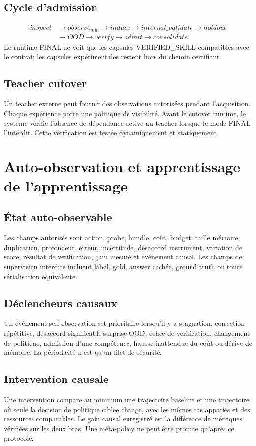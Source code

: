 \documentclass[11pt,a4paper]{report}
\begin{document}
\section{Cycle d'admission}
\[
\begin{aligned}
inspect &\to observe_{min} \to induce \to internal\_validate \to holdout \\
&\to OOD \to verify \to admit \to consolidate.
\end{aligned}
\]
Le runtime FINAL ne voit que les capsules VERIFIED\_SKILL compatibles avec le contrat; les capsules expérimentales restent hors du chemin certifiant.

\section{Teacher cutover}
Un teacher externe peut fournir des observations autorisées pendant l'acquisition. Chaque expérience porte une politique de visibilité. Avant le cutover runtime, le système vérifie l'absence de dépendance active au teacher lorsque le mode FINAL l'interdit. Cette vérification est testée dynamiquement et statiquement.

\chapter{Auto-observation et apprentissage de l'apprentissage}
\section{État auto-observable}
Les champs autorisés sont action, probe, bundle, coût, budget, taille mémoire, duplication, profondeur, erreur, incertitude, désaccord instrument, variation de score, résultat de verification, gain mesuré et événement causal. Les champs de supervision interdite incluent label, gold, answer cachée, ground truth ou toute sérialisation équivalente.

\section{Déclencheurs causaux}
Un événement self-observation est prioritaire lorsqu'il y a stagnation, correction répétitive, désaccord significatif, surprise OOD, échec de vérification, changement de politique, admission d'une compétence, hausse inattendue du coût ou dérive de mémoire. La périodicité n'est qu'un filet de sécurité.

\section{Intervention causale}
Une intervention compare au minimum une trajectoire baseline et une trajectoire où seule la décision de politique ciblée change, avec les mêmes cas appariés et des ressources comparables. Le gain causal enregistré est la différence de métriques vérifiées sur les deux bras. Une méta-policy ne peut être promue qu'après ce protocole.
\end{document}
